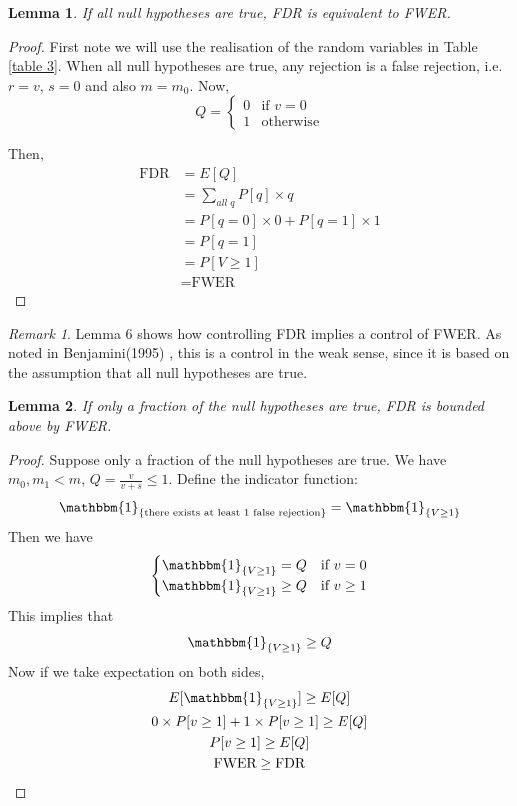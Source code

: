 \documentclass[12pt]{article}
\theoremstyle{plain}
\newtheorem{lemma}{Lemma}
\theoremstyle{definition}
\theoremstyle{remark}
\newtheorem*{remark}{Remark}
\begin{document}
\begin{lemma}
If all null hypotheses are true, FDR is equivalent to FWER. \cite{5.7}
\end{lemma}

\begin{proof} \cite{5.3}
First note we will use the realisation of the random variables in Table \ref{table 3}. When all null hypotheses are true, any rejection is a false rejection, i.e. $r=v$, $s=0$ and also $m=m_0$. Now, 
\begin{equation*}
  Q=
    \begin{cases}
    0&\text{if $v=0$}\\
    1&\text{otherwise}
    \end{cases}
\end{equation*}

Then,
\begin{align*}
    \text{FDR}&=E[Q]\\
    &=\sum_{all\;q}P[q]\times q\\
    &=P[q=0]\times0+P[q=1]\times1\\
    &=P[q=1]\\
    &=P[V\ge 1]\\
    &=\text{FWER}
\end{align*}
\end{proof}

\begin{remark}
Lemma 6 shows how controlling FDR implies a control of FWER. As noted in Benjamini(1995) \cite{5.7}, this is a control in the weak sense, since it is based on the assumption that all null hypotheses are true.
\end{remark}

\begin{lemma}
If only a fraction of the null hypotheses are true, FDR is bounded above by FWER. \cite{5.7}
\end{lemma}

\begin{proof} \cite{5.3}
Suppose only a fraction of the null hypotheses are true. We have $m_0, m_1<m$, $Q=\frac{v}{v+s}\leq1$. Define the indicator function:
\[\mathbbm{1}_{\{\text{there exists at least 1 false rejection}\}}=\mathbbm{1}_{\{V\ge1\}}\]
Then we have
\begin{equation*}
    \begin{cases}
    \mathbbm{1}_{\{V\ge1\}}=Q & \text{if $v=0$}\\
    \mathbbm{1}_{\{V\ge1\}}\ge Q & \text{if $v\ge1$}
    \end{cases}
\end{equation*}
This implies that\[\mathbbm{1}_{\{V\ge1\}}\ge Q\]
Now if we take expectation on both sides,
\begin{gather*}
    E[\mathbbm{1}_{\{V\ge1\}}]\ge E[Q]\\
    0\times P[v\ge1]+1\times P[v\ge1]\ge E[Q]\\
    P[v\ge1]\ge E[Q]\\
    \text{FWER}\ge \text{FDR}
\end{gather*}
\end{proof}
\end{document}
